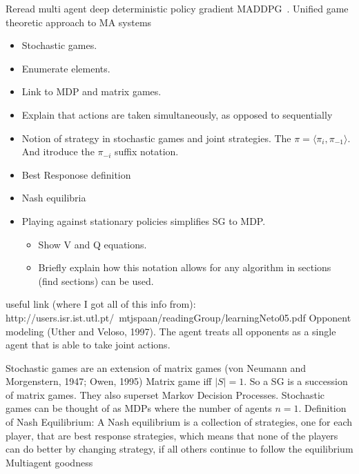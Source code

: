 \documentclass{../main.tex}{subfiles}
\begin{document}
Reread multi agent deep deterministic policy gradient MADDPG~\cite{Lowe2017}. Unified game theoretic approach to MA systems~\citep{Lanctot2017}

\begin{itemize}
\item Stochastic games.
\item Enumerate elements.
\item Link to MDP and matrix games.
\item Explain that actions are taken simultaneously, as opposed to sequentially
\item Notion of strategy in stochastic games and joint strategies. The $ \pi = \langle \pi_i, \pi_{-1} \rangle $. And itroduce the $\pi_{-i}$ suffix notation.
\item Best Responose definition
\item Nash equilibria
\item Playing against stationary policies simplifies SG to MDP.%
    \begin{itemize}
    \item Show V and Q equations.
    \item Briefly explain how this notation allows for any algorithm in sections (find sections) can be used.
    \end{itemize}
\end{itemize}

useful link (where I got all of this info from): http://users.isr.ist.utl.pt/~mtjspaan/readingGroup/learningNeto05.pdf
Opponent modeling (Uther and Veloso, 1997). The agent treats all opponents as a single agent that is able to take joint actions.

Stochastic games are an extension of matrix games  (von Neumann and Morgenstern, 1947; Owen, 1995) Matrix game iff $\mid S \mid = 1$. So a SG is a succession of matrix games. They also superset Markov Decision Processes. Stochastic games can be thought of as MDPs where the number of agents $n = 1$. 
Definition of Nash Equilibrium: A Nash equilibrium is a collection of strategies, one for each player, that are best response strategies, which means that none of the players can do better by changing strategy, if all others continue to follow the equilibrium
Multiagent goodness
\end{document}
